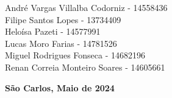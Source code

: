\vspace*{1cm}

\setcounter{footnote}{1}

\renewcommand{\thefootnote}{\fnsymbol{footnote}}
\begin{center}
{ 
    \sc  André Vargas Villalba Codorniz - 14558436 \\ %
    \sc  Filipe Santos Lopes - 13734409 \\ %
    \sc  Heloísa Pazeti - 	14577991 \\ %
    \sc  Lucas Moro Farias - 14781526 \\ %
    \sc  Miguel Rodrigues Fonseca - 14682196 \\ %
    \sc  Renan Correia Monteiro Soares  - 14605661 \\ %
}
\vspace*{1cm}

\vspace*{-.8cm}
\end{center}

\baselineskip 17pt

\vspace*{1.5cm}
\begin{center}
    {{\bf São Carlos, Maio de 2024}} %
\end{center}

\vspace*{.05cm}

\renewcommand{\thefootnote}{\arabic{footnote}}

\setcounter{footnote}{1}

\pagebreak

\baselineskip 19pt